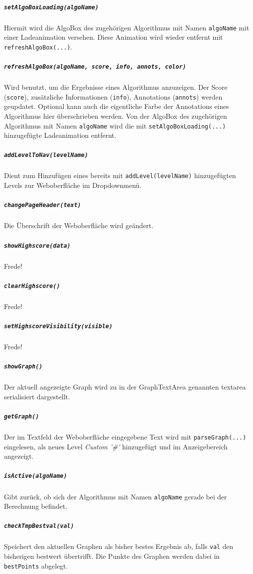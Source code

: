 \documentclass[a4paper,twocolumn]{scrartcl}
\begin{document}
    \subparagraph{\texttt{setAlgoBoxLoading(algoName)}} 
    Hiermit wird die AlgoBox des zugehörigen Algorithmus mit Namen \texttt{algoName} mit einer Ladeanimation versehen. Diese Animation wird wieder entfernt mit \texttt{refreshAlgoBox(...)}.
    \subparagraph{\texttt{refreshAlgoBox(algoName, score, info, annots, color)}} 
    Wird benutzt, um die Ergebnisse eines Algorithmus anzuzeigen. Der Score (\texttt{score}), zusätzliche Informationen (\texttt{info}), Annotations (\texttt{annots}) werden geupdatet. Optional kann auch die eigentliche Farbe der Annotations eines Algorithmus hier überschrieben werden.
    Von der AlgoBox des zugehörigen Algorithmus mit Namen \texttt{algoName} wird die mit \texttt{setAlgoBoxLoading(...)} hinzugefügte Ladeanimation entfernt.
    \subparagraph{\texttt{addLevelToNav(levelName)}} 
    Dient zum Hinzufügen eines bereits mit \texttt{addLevel(levelName)} hinzugefügten Levels zur Weboberfläche im Dropdownmenü.
    \subparagraph{\texttt{changePageHeader(text)}} 
    Die Überschrift der Weboberfläche wird geändert.
    \subparagraph{\texttt{showHighscore(data)}} 
    Frede!
    \subparagraph{\texttt{clearHighscore()}} 
    Frede!
    \subparagraph{\texttt{setHighscoreVisibility(visible)}} 
    Frede!
    \subparagraph{\texttt{showGraph()}} 
    Der aktuell angezeigte Graph wird zu in der GraphTextArea genannten textarea serialisiert dargestellt.
    \subparagraph{\texttt{getGraph()}} 
    Der im Textfeld der Weboberfläche eingegebene Text wird mit \texttt{parseGraph(...)} eingelesen, als neues Level \textit{Custom '\#'} hinzugefügt und im Anzeigebereich angezeigt.
    \subparagraph{\texttt{isActive(algoName)}} 
    Gibt zurück, ob sich der Algorithmus mit Namen \texttt{algoName} gerade bei der Berechnung befindet.
    \subparagraph{\texttt{checkTmpBestval(val)}} 
    Speichert den aktuellen Graphen als bisher bestes Ergebnis ab, falls \texttt{val} den bisherigen bestwert übertrifft. Die Punkte des Graphen werden dabei in \texttt{bestPoints} abgelegt.
\end{document}
